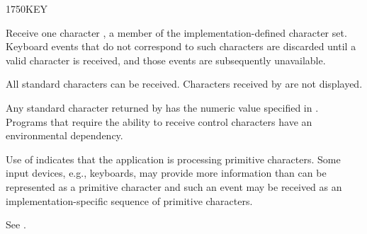 \vspace*{-1ex}\enlargethispage{8ex}
\begin{worddef}{1750}{KEY}
\item {}

	Receive one character , a member of the
	implementation-defined character set. Keyboard events that do
	not correspond to such characters are discarded until a valid
	character is received, and those events are subsequently
	unavailable.

	All standard characters can be received. Characters received by
	 are not displayed.

	Any standard character returned by  has the numeric
	value specified in .
	Programs that require the ability to receive control characters
	have an environmental dependency.


	\begin{rationale} %
		Use of  indicates that the application is processing
		primitive characters.  Some input devices, e.g., keyboards,
		may provide more information than can be represented as a
		primitive character and such an event may be received as an
		implementation-specific sequence of primitive characters.

		See .
	\end{rationale}
\end{worddef}

